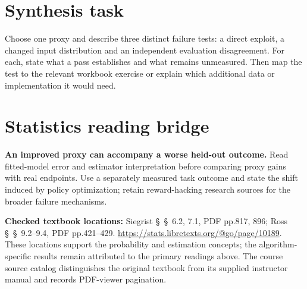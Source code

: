 \documentclass[11pt]{scrartcl}
\begin{document}
\section*{Synthesis task}
Choose one proxy and describe three distinct failure tests: a direct exploit,
a changed input distribution and an independent evaluation disagreement.
For each, state what a pass establishes and what remains unmeasured. Then map
the test to the relevant workbook exercise or explain which additional data
or implementation it would need.
\section*{Statistics reading bridge}
\textbf{An improved proxy can accompany a worse held-out outcome.} Read fitted-model error and estimator interpretation before comparing proxy gains with real endpoints. Use a separately measured task outcome and state the shift induced by policy optimization; retain reward-hacking research sources for the broader failure mechanisms.

\textbf{Checked textbook locations:} Siegrist \S~\S~6.2, 7.1, PDF pp.817, 896; Ross \S~\S~9.2--9.4, PDF pp.421--429. \url{https://stats.libretexts.org/@go/page/10189}. These locations support the probability and estimation concepts; the algorithm-specific results remain attributed to the primary readings above. The course source catalog distinguishes the original textbook from its supplied instructor manual and records PDF-viewer pagination.
\end{document}
